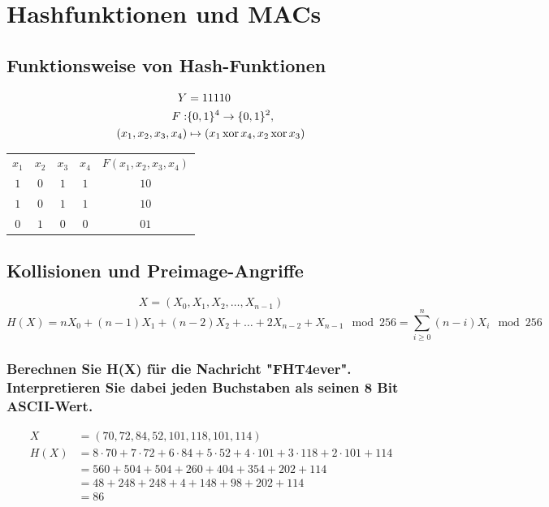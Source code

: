 \section{Hashfunktionen und MACs}
\subsection{Funktionsweise von Hash-Funktionen}

\begin{eqnarray}
	 Y                      & = 11110 \\
	 F:                     & \{0,1\}^4 \rightarrow \{0,1\}^2 ,\\
	 (x_1, x_2, x_3, x_4) & \mapsto (x_1 \operatorname*{xor} x_4, x_2 \operatorname*{xor} x_3)
\end{eqnarray}

\begin{center}
\begin{tabular}{cc|cc|c}
$x_1$ & $x_2$ & $x_3$ & $x_4$ & $F(x_1,x_2,x_3,x_4)$ \\
$1$ & $0$ & $1$ & $1$ & $10$ \\
$1$ & $0$ & $1$ & $1$ & $10$ \\
$0$ & $1$ & $0$ & $0$ & $01$ \\
\end{tabular}
\end{center}

\subsection{Kollisionen und Preimage-Angriffe}
\[ X = (X_0,X_1,X_2, \ldots , X_{n-1}) \]
\[H(X) = nX_0 + (n - 1)X_1 + (n - 2)X_2 + \ldots +2X_{n−2} + X_{n−1} \mod 256 = \sum\limits_{i\ge 0}^n (n-i)X_i \mod 256 \]
\subsubsection{Berechnen Sie H(X) für die Nachricht "FHT4ever". Interpretieren Sie dabei jeden Buchstaben als seinen 8 Bit ASCII-Wert.}
\begin{align}
X    &= (70, 72, 84, 52, 101, 118, 101, 114) \\
H(X) &= 8 \cdot 70 + 7 \cdot 72 + 6 \cdot 84 + 5 \cdot 52 + 4 \cdot 101 + 3 \cdot 118 + 2 \cdot 101 + 114\\
     &= 560 + 504 + 504 + 260 + 404 + 354 + 202 + 114 \\
     &= 48 + 248 + 248 + 4 + 148 + 98 + 202 + 114     \\
     &= 86
\end{align}

